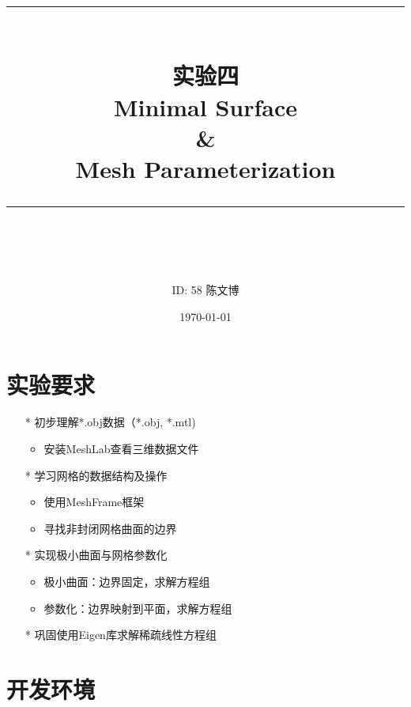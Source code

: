\documentclass[14pt]{scrartcl} %
\title{	
	\normalfont\normalsize
	\rule{\linewidth}{0.5pt}\\ %
	\vspace{20pt} %
	{\huge 实验四	\\Minimal Surface\\\&\\Mesh Parameterization}\\ %
	\vspace{12pt} %
	\rule{\linewidth}{2pt}\\ %
	\vspace{12pt} %
}
\author{\LARGE ID: 58		陈文博} %
\date{\normalsize\today} %
\begin{document}
	
	\maketitle %
	
	
	\section{实验要求}
	
	
	\begin{itemize}
		\item[*] 初步理解*.obj数据（*.obj, *.mtl)
		\begin{itemize}
			\item 安装MeshLab查看三维数据文件
		\end{itemize}
		\item[*] 学习网格的数据结构及操作
		\begin{itemize}
			\item 使用MeshFrame框架
			\item 寻找非封闭网格曲面的边界	
		\end{itemize}
		\item[*] 实现极小曲面与网格参数化
		\begin{itemize}
			\item 极小曲面：边界固定，求解方程组
			\item 参数化：边界映射到平面，求解方程组	
		\end{itemize}
		\item[*] 巩固使用Eigen库求解稀疏线性方程组
		
		
	\end{itemize}
	
	
	\section{开发环境}
	
\end{document}
